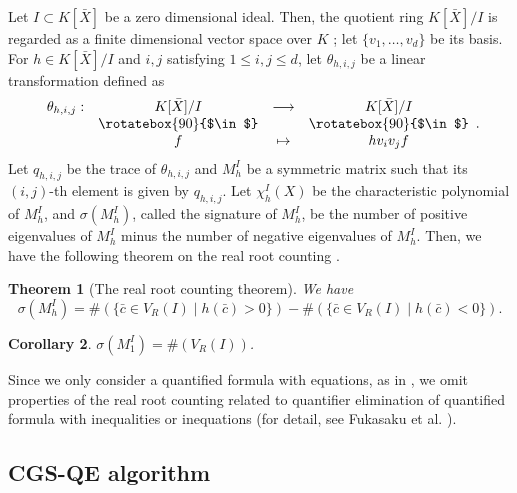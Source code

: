 \documentclass{birkjour}
\theoremstyle{plain}
\newtheorem{theorem}{Theorem}
\newtheorem{corollary}[theorem]{Corollary}
\theoremstyle{definition}
\newcommand{\cbar}[0]{\bar{c}}
\newcommand{\Xbar}{\bar{X}}
\begin{document}
    Let $I \subset {K}[\Xbar]$ be a zero dimensional ideal. Then,
    the quotient ring $K[\Xbar]/I$ is regarded as a finite dimensional vector
    space over $K$ \cite{cox-lit-osh2005}; let $\{v_1,\dots,v_d\}$ be its basis.
    For $h\in K[\Xbar]/I$ and $i,j$ satisfying $1\le i,j\le d$,
    let $\theta_{h,i,j}$ be a linear transformation defined as
    \[
        \begin{array}{cccc}
            {\theta_{h,i,j}} : & {K}[\bar{X}]/I & {\longrightarrow} & {K}[\bar{X}]/I \\
            & \rotatebox{90}{$\in$} & & \rotatebox{90}{$\in$} \\
            & f & \mapsto & hv_iv_jf
        \end{array}
        .
    \]
    Let $q_{h,i,j}$ be the trace of $\theta_{h,i,j}$ and $M_h^I$ be a symmetric matrix
    such that its $(i,j)$-th element is given by $q_{h,i,j}$.
    Let $\chi_h^I(X)$ be the characteristic polynomial of $M_h^I$, and $\sigma(M_h^I)$,
    called the signature of $M_h^I$, 
    be the number of positive eigenvalues of $M_h^I$ minus the number of negative 
    eigenvalues of $M_h^I$. Then, we have the following theorem on the real root counting
    \cite{bec-woe1994,ped-roy-szp1993}.

    \begin{theorem}[The real root counting theorem]
        We have
        \[
            \sigma(M_h^I)=\#(\{\cbar\in V_R(I)\mid h(\cbar)>0\})
            -\#(\{\cbar\in V_R(I)\mid h(\cbar)<0\}).
        \]
    \end{theorem}

    \begin{corollary}
        $\sigma(M_1^I)=\#(V_R(I))$.
    \end{corollary}

    Since we only consider a quantified formula with equations, as in 
    , we omit properties of the real root 
    counting related to quantifier elimination of quantified formula with inequalities or inequations (for detail, see Fukasaku et al. \cite{fuk-iwa-sat2015}).

    \subsection{CGS-QE algorithm}
    \label{sec:cgs-qe-alg}
\end{document}
